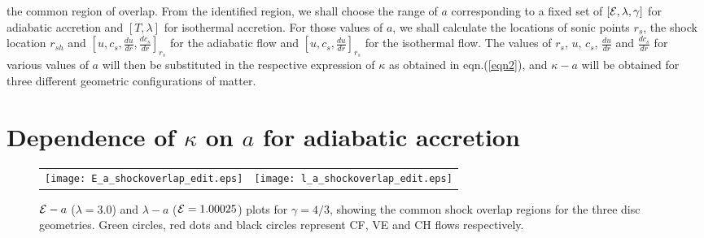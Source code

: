 \documentclass[10pt,authoryear]{article}
\begin{document}
the common region of overlap. From the identified region, we shall choose the range of $a$ corresponding to a fixed set of 
$\left[{\cal E},\lambda,\gamma\right]$ for adiabatic accretion and $\left[T,\lambda\right]$ for isothermal accretion. For those values 
of $a$, we shall calculate the locations of sonic points $r_s$, the shock location $r_{sh}$ and $\left[u,c_s,\frac{du}{dr},\frac{dc_s}{dr}\right]_{r_s}$ 
for the adiabatic flow and $\left[u,c_s,\frac{du}{dr}\right]_{r_s}$ for the isothermal flow. The values of $r_s$, $u$, $c_s$, $\frac{du}{dr}$ and 
$\frac{dc_s}{dr}$ for various values of $a$ will then be substituted in the respective expression of $\kappa$ as obtained in eqn.(\ref{eqn2}), 
and $\kappa - a$ will be obtained for three different geometric configurations of matter.

\section{Dependence of $\kappa$ on $a$ for adiabatic accretion}

\begin{figure}[h!]
\centering
\begin{tabular}{cc}
\texttt{[image: E\_a\_shockoverlap\_edit.eps]} &
\texttt{[image: l\_a\_shockoverlap\_edit.eps]}
\end{tabular}
\caption{${\cal E} - a$ ($\lambda=3.0$) and $\lambda - a$ (${\cal E}=1.00025$) plots for $\gamma=4/3$, showing the common shock overlap regions for 
the three disc geometries. Green circles, red dots and black circles represent CF, VE and CH flows respectively.}
\label{fig1}
\end{figure}
\end{document}
